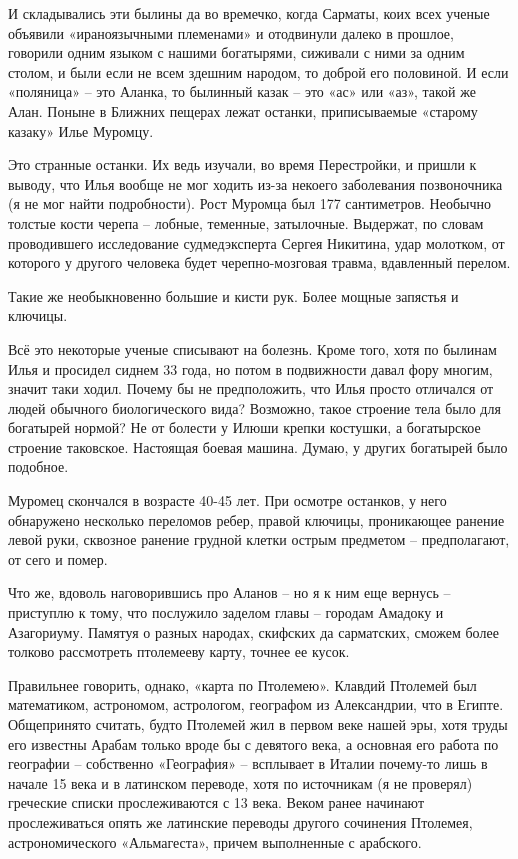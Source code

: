 И складывались эти былины да во времечко, когда Сарматы, коих всех ученые объявили «ираноязычными племенами» и отодвинули далеко в прошлое, говорили одним языком с нашими богатырями, сиживали с ними за одним столом, и были если не всем здешним народом, то доброй его половиной. И если «поляница» – это Аланка, то былинный казак – это «ас» или «аз», такой же Алан. Поныне в Ближних пещерах лежат останки, приписываемые «старому казаку» Илье Муромцу.

Это странные останки. Их ведь изучали, во время Перестройки, и пришли к выводу, что Илья вообще не мог ходить из-за некоего заболевания позвоночника (я не мог найти подробности). Рост Муромца был 177 сантиметров. Необычно толстые кости черепа – лобные, теменные, затылочные. Выдержат, по словам проводившего исследование судмедэксперта Сергея Никитина, удар молотком, от которого у другого человека будет черепно-мозговая травма, вдавленный перелом.

Такие же необыкновенно большие и кисти рук. Более мощные запястья и ключицы.

Всё это некоторые ученые списывают на болезнь. Кроме того, хотя по былинам Илья и просидел сиднем 33 года, но потом в подвижности давал фору многим, значит таки ходил. Почему бы не предположить, что Илья просто отличался от людей обычного биологического вида? Возможно, такое строение тела было для богатырей нормой? Не от болести у Илюши крепки костушки, а богатырское строение таковское. Настоящая боевая машина. Думаю, у других богатырей было подобное.

Муромец скончался в возрасте 40-45 лет. При осмотре останков, у него обнаружено несколько переломов ребер, правой ключицы, проникающее ранение левой руки, сквозное ранение грудной клетки острым предметом – предполагают, от сего и помер.

Что же, вдоволь наговорившись про Аланов – но я к ним еще вернусь – приступлю к тому, что послужило заделом главы – городам Амадоку и Азагориуму. Памятуя о разных народах, скифских да сарматских, сможем более толково рассмотреть птолемееву карту, точнее ее кусок. 

Правильнее говорить, однако, «карта по Птолемею». Клавдий Птолемей был математиком, астрономом, астрологом, географом из Александрии, что в Египте. Общепринято считать, будто Птолемей жил в первом веке нашей эры, хотя труды его известны Арабам только вроде бы с девятого века, а основная его работа по географии – собственно «География» – всплывает в Италии почему-то лишь в начале 15 века и в латинском переводе, хотя по источникам (я не проверял) греческие списки прослеживаются с 13 века. Веком ранее начинают прослеживаться опять же латинские переводы другого сочинения Птолемея, астрономического «Альмагеста», причем выполненные с арабского. 

